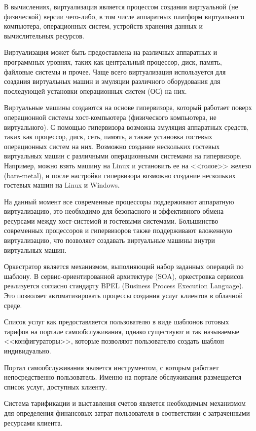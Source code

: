В вычислениях, виртуализация является процессом создания виртуальной (не физической) версии чего-либо, в том числе аппаратных платформ виртуального компьютера, операционных систем, устройств хранения данных и вычислительных ресурсов.

Виртуализация может быть предоставлена на различных аппаратных и программных уровнях, таких как центральный процессор, диск, память, файловые системы и прочее.
Чаще всего виртуализация используется для создания виртуальных машин и эмуляции различного оборудования для последующей установки операционных систем (ОС) на них.

Виртуальные машины создаются на основе гипервизора, который работает поверх операционной системы хост-компьютера (физического компьютера, не виртуального).
С помощью гипервизора возможна эмуляция аппаратных средств, таких как процессор, диск, сеть, память, а также установка гостевых операционных систем на них.
Возможно создание нескольких гостевых виртуальных машин с различными операционными системами на гипервизоре.
Например, можно взять машину на Linux и установить ее на <<голое>> железо (bare-metal), и после настройки гипервизора возможно создание нескольких гостевых машин на Linux и Windows.

На данный момент все современные процессоры поддерживают аппаратную виртуализацию, это необходимо для безопасного и эффективного обмена ресурсами между хост-системой и гостевыми системами.
Большинство современных процессоров и гипервизоров также поддерживают вложенную виртуализацию, что позволяет создавать виртуальные машины внутри виртуальных машин.

Оркестратор является механизмом, выполняющий набор заданных операций по шаблону.
В сервис-ориентированной архитектуре (SOA), оркестровка сервисов реализуется согласно стандарту BPEL (Business Process Execution Language).
Это позволяет автоматизировать процессы создания услуг клиентов в облачной среде.

Список услуг как предоставляется пользователю в виде шаблонов готовых тарифов на портале самообслуживания, однако существуют и так называемые <<конфигураторы>>, которые позволяют пользователю создать шаблон индивидуально.

Портал самообслуживания является инструментом, с которым работает непосредственно пользователь.
Именно на портале обслуживания размещается список услуг, доступных клиенту.

Система тарификации и выставления счетов является необходимым механизмом для определения финансовых затрат пользователя в соответствии с затраченными ресурсами клиента.

